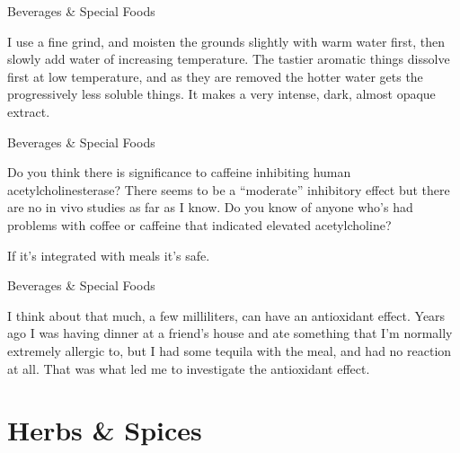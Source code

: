 \documentclass[11pt,oneside,openany,extrafontsizes]{memoir}
\begin{document}
\begin{standalonequote}{Beverages \& Special Foods}

    \begin{answer}
      I use a fine grind, and moisten the grounds slightly with warm water first, then slowly add water of increasing temperature. The tastier aromatic things dissolve first at low temperature, and as they are removed the hotter water gets the progressively less soluble things. It makes a very intense, dark, almost opaque extract.
    \end{answer}
\end{standalonequote}

\begin{qaexchange}{Beverages \& Special Foods}

    \begin{question}
        Do you think there is significance to caffeine inhibiting human acetylcholinesterase? There seems to be a \enquote{moderate} inhibitory effect but there are no in vivo studies as far as I know. Do you know of anyone who's had problems with coffee or caffeine that indicated elevated acetylcholine?
    \end{question}

    \begin{answer}
      If it's integrated with meals it's safe.
    \end{answer}
\end{qaexchange}

\begin{standalonequote}{Beverages \& Special Foods}

    \begin{answer}
      I think about that much, a few milliliters, can have an antioxidant effect. Years ago I was having dinner at a friend's house and ate something that I'm normally extremely allergic to, but I had some tequila with the meal, and had no reaction at all. That was what led me to investigate the antioxidant effect.
    \end{answer}
\end{standalonequote}

\section{Herbs \& Spices}
\end{document}
